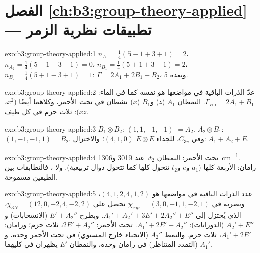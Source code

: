 \section*{الفصل \ref{ch:b3:group-theory-applied} --- تطبيقات نظرية الزمر}

\begin{solution}{exo:b3:group-theory-applied:1}
$n_{A_1} = \frac14(5 - 1 + 3 + 1) = 2$، $n_{A_2} = \frac14(5 - 1 - 3 - 1) = 0$،
$n_{B_1} = \frac14(5 + 1 + 3 - 1) = 2$، $n_{B_2} = \frac14(5 + 1 - 3 + 1) = 1$:
$\Gamma = 2A_1 + 2B_1 + B_2$، وبعده 5.
\end{solution}

\begin{solution}{exo:b3:group-theory-applied:2}
عدّ الذرات الباقية في مواضعها هو نفسه كما في الماء: $\Gamma_{\mathrm{vib}} = 2A_1 + B_1$. النمطان $A_1$ ($z$) 
و$B_1$ ($x$) نشطان في تحت الأحمر، وكلاهما  أيضًا ($x^2$، $xz$): ثلاث
حزم في كل طيف.
\end{solution}

\begin{solution}{exo:b3:group-theory-applied:3}
$B_1\otimes B_2$:  $(1, 1, -1, -1)$ $= A_2$. $A_2\otimes B_1$: $(1, -1, -1,
1) = B_2$. وفي $C_{3v}$، للجداء $E\otimes E$  $(4, 1, 0)$؛ والاختزال: $A_1 + A_2 +
E$.
\end{solution}

\begin{solution}{exo:b3:group-theory-applied:4}
تحت الأحمر: النمطان $t_2$، عند 3019 و\qty{1306}{cm^{-1}}. رامان: الأربعة كلها ($a_1$
و$e$ و$t_2$ تتحول كلها كما تتحول دوال تربيعية). ولا ، فالتطابقات
بين الطيفين مسموحة.
\end{solution}

\begin{solution}{exo:b3:group-theory-applied:5}
عدد الذرات الباقية في مواضعها هو $(4, 1, 2, 4, 1, 2)$، وبضربه في $\chi_{xyz} = (3, 0, -1, 1, -2, 1)$ نحصل على
$\chi_{3N} = (12, 0, -2, 4, -2, 2)$، الذي يُختزل إلى $A_1' + A_2' + 3E' + 2A_2'' +
E''$. وبطرح $E' + A_2''$ (الانسحابات) و$A_2' + E''$ (الدورانات): $A_1' + 2E'
+ A_2''$. تحت الأحمر: $2E' + A_2''$، ثلاث حزم؛ ورامان: $A_1' + 2E'$، ثلاث حزم. والنمط $A_2''$
(الانحناء خارج المستوي) في تحت الأحمر وحده، و$A_1'$ (التمدد المتناظر) في رامان وحده، 
والنمطان $E'$ يظهران في كليهما.
\end{solution}

